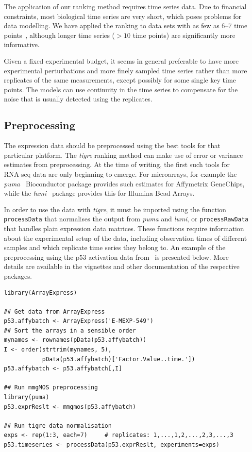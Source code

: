 \documentclass[11pt]{article}
\newcommand{\Rpackage}[1]{\emph{#1}}
\newcommand{\tigre}[0]{\Rpackage{tigre}}
\begin{document}
The application of our ranking method requires time series data.  Due
to financial constraints, most biological time series are very short,
which poses problems for data modelling.  We have applied the ranking
to data sets with as few as 6--7 time
points~\cite{Honkela2010MLSP,Honkela2010PNAS}, although longer time
series ($> 10$ time points) are significantly more informative.

Given a fixed experimental budget, it seems in general preferable to
have more experimental perturbations and more finely sampled time
series rather than more replicates of the same measurements, except
possibly for some single key time points.  The models can use
continuity in the time series to compensate for the noise that is
usually detected using the replicates.

\subsection{Preprocessing}

The expression data should be preprocessed using the best tools for
that particular platform.  The \tigre{} ranking method can make use of
error or variance estimates from preprocessing.  At the time of
writing, the first such tools for RNA-seq data are only beginning to emerge.  For microarrays, for example the
\Rpackage{puma}~\cite{Pearson2009} Bioconductor package provides such
estimates for Affymetrix GeneChips, while the
\Rpackage{lumi}~\cite{Du2008} package provides this for Illumina Bead
Arrays.

In order to use the data with \tigre{}, it must be imported using the
function \texttt{processData} that normalises the output from
\Rpackage{puma} and \Rpackage{lumi}, or \texttt{processRawData} that
handles plain expression data matrices.  These functions require
information about the experimental setup of the data, including
observation times of different samples and which replicate time series
they belong to.  An example of the preprocessing using the p53
activation data from~\cite{Barenco2006a} is presented below.  More
details are available in the vignettes and other documentation of the
respective packages.

\begin{lstlisting}[frame=single]
library(ArrayExpress)

## Get data from ArrayExpress
p53.affybatch <- ArrayExpress('E-MEXP-549')
## Sort the arrays in a sensible order
mynames <- rownames(pData(p53.affybatch))
I <- order(strtrim(mynames, 5),
           pData(p53.affybatch)['Factor.Value..time.'])
p53.affybatch <- p53.affybatch[,I]

## Run mmgMOS preprocessing
library(puma)
p53.exprReslt <- mmgmos(p53.affybatch)

## Run tigre data normalisation
exps <- rep(1:3, each=7)     # replicates: 1,...,1,2,...,2,3,...,3
p53.timeseries <- processData(p53.exprReslt, experiments=exps)
\end{lstlisting}
\end{document}
